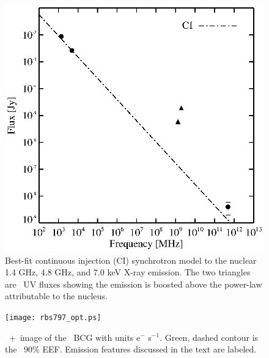 \begin{figure}
  \begin{center}
    \begin{minipage}{\linewidth}
      \includegraphics*[width=\textwidth, trim=10mm 5mm 10mm 10mm, clip]{radiofit.eps}
    \end{minipage}
    \caption{Best-fit continuous injection (CI) synchrotron model to
      the nuclear 1.4 GHz, 4.8 GHz, and 7.0 keV X-ray emission. The
      two triangles are \galex\ UV fluxes showing the emission is
      boosted above the power-law attributable to the nucleus.}
    \label{fig:sync}
    \end{center}
\end{figure}

\begin{figure}
  \begin{center}
    \begin{minipage}{\linewidth}
      \texttt{[image: rbs797\_opt.ps]}
    \end{minipage}
    \caption{\hst\ \myi+\myv\ image of the \rbs\ BCG with units e$^-$
      s$^{-1}$. Green, dashed contour is the \cxo\ 90\% EEF. Emission
      features discussed in the text are labeled.}
    \label{fig:hst}
  \end{center}
\end{figure}

